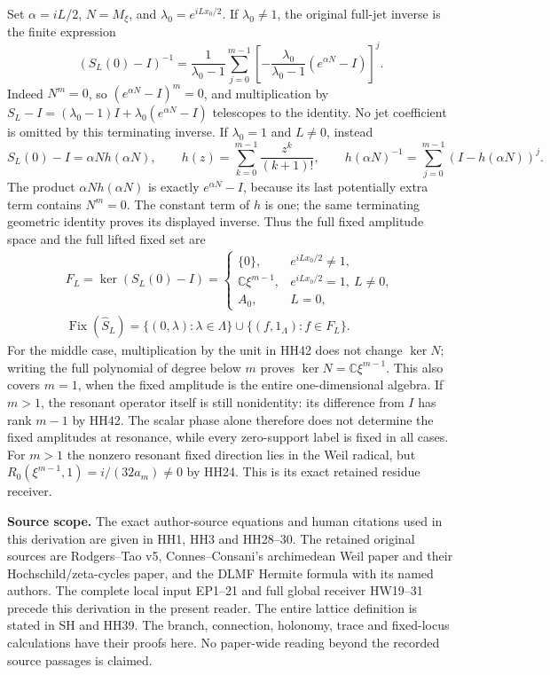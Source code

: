 Set $\alpha=iL/2$, $N=M_\xi$, and
$\lambda_0=e^{iLx_0/2}$. If $\lambda_0\ne1$, the original
full-jet inverse is the finite expression
\[
 (S_L(0)-I)^{-1}
  =\frac1{\lambda_0-1}
      \sum_{j=0}^{m-1}
       \left[-\frac{\lambda_0}{\lambda_0-1}
                         (e^{\alpha N}-I)\right]^j .
 \tag{HH41}\label{hh:fixed-inverse}
\]
Indeed $N^m=0$, so $(e^{\alpha N}-I)^m=0$, and multiplication
by $S_L-I=(\lambda_0-1)I+\lambda_0(e^{\alpha N}-I)$
telescopes to the identity. No jet coefficient is omitted by
this terminating inverse. If $\lambda_0=1$ and $L\ne0$, instead
\[
 S_L(0)-I=\alpha N h(\alpha N),\qquad
 h(z)=\sum_{k=0}^{m-1}\frac{z^k}{(k+1)!},\qquad
 h(\alpha N)^{-1}
      =\sum_{j=0}^{m-1}(I-h(\alpha N))^j .
 \tag{HH42}\label{hh:fixed-resonance}
\]
The product $\alpha Nh(\alpha N)$ is exactly $e^{\alpha N}-I$,
because its last potentially extra term contains $N^m=0$.
The constant term of $h$ is one; the same terminating geometric
identity proves its displayed inverse. Thus the full fixed
amplitude space and the full lifted fixed set are
\[
 \begin{gathered}
 F_L=\ker(S_L(0)-I)=
 \begin{cases}
   \{0\},&e^{iLx_0/2}\ne1,\\
   \mathbb C\xi^{m-1},&e^{iLx_0/2}=1,\ L\ne0,\\
   A_0,&L=0,
  \end{cases}\\[5pt]
 \operatorname{Fix}(\widehat S_L)=
 \{(0,\lambda):\lambda\in\Lambda\}
       \cup\{(f,1_\Lambda):f\in F_L\}.
 \end{gathered}
 \tag{HH43}\label{hh:fixed-locus}
\]
For the middle case, multiplication by the unit in HH42 does
not change $\ker N$; writing the full polynomial of degree below
$m$ proves $\ker N=\mathbb C\xi^{m-1}$. This also covers $m=1$,
when the fixed amplitude is the entire one-dimensional algebra.
If $m>1$, the resonant operator itself is still nonidentity:
its difference from $I$ has rank $m-1$ by HH42. The scalar phase
alone therefore does not determine the fixed amplitudes at
resonance, while every zero-support label is fixed in all cases.
For $m>1$ the nonzero resonant fixed direction lies in the Weil
radical, but
$R_0(\xi^{m-1},1)=i/(32a_m)\ne0$ by HH24.
This is its exact retained residue receiver.


\par\medskip\noindent\textbf{Source scope.}
The exact author-source equations and human citations used in this
derivation are given in HH1, HH3 and HH28--30. The retained original
sources are Rodgers--Tao v5, Connes--Consani's archimedean Weil paper
and their Hochschild/zeta-cycles paper, and the DLMF Hermite formula
with its named authors. The complete local input EP1--21 and full
global receiver HW19--31 precede this derivation in the present
reader. The entire lattice definition is stated in SH and HH39.
The branch, connection, holonomy, trace and fixed-locus calculations
have their proofs here. No paper-wide reading beyond the recorded
source passages is claimed.

